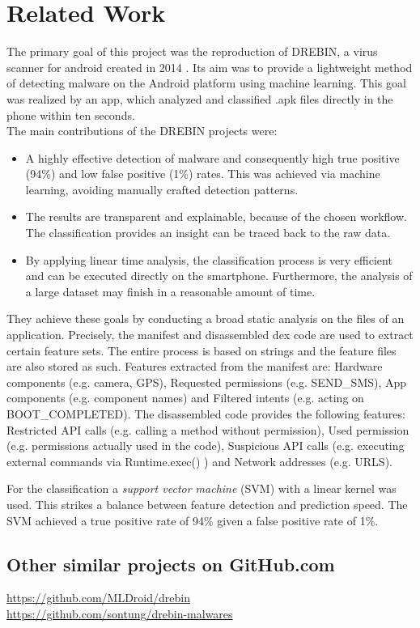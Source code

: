 \section{Related Work}

The primary goal of this project was the reproduction of DREBIN, a
virus scanner for android created in 2014 \cite{drebin}.
Its aim was to provide a lightweight method of detecting malware on
the Android platform using machine learning. This goal was realized
by an app, which analyzed and classified .apk files directly in the
phone within ten seconds. \\
The main contributions of the DREBIN projects were: 
\begin{itemize}
\item A highly effective detection of malware and consequently high true
positive (94\%) and low false positive (1\%) rates. This was achieved
via machine learning, avoiding manually crafted detection patterns. 
\item The results are transparent and explainable, because of the chosen
workflow. The classification provides an insight can be traced back
to the raw data. 
\item By applying linear time analysis, the classification process is very
efficient and can be executed directly on the smartphone. Furthermore,
the analysis of a large dataset may finish in a reasonable amount
of time.
\end{itemize}
They achieve these goals by conducting a broad static analysis on
the files of an application. Precisely, the manifest and disassembled
dex code are used to extract certain feature sets. The entire process
is based on strings and the feature files are also stored as such.
Features extracted from the manifest are: Hardware components (e.g.
camera, GPS), Requested permissions (e.g. SEND\_SMS), App components
(e.g. component names) and Filtered intents (e.g. acting on BOOT\_COMPLETED).
The disassembled code provides the following features: Restricted
API calls (e.g. calling a method without permission), Used permission
(e.g. permissions actually used in the code), Suspicious API calls
(e.g. executing external commands via Runtime.exec() ) and Network
addresses (e.g. URLS). 

For the classification a \emph{support vector machine} (SVM) \cite{cristianini2000introduction} with a linear kernel was used. This strikes a balance between feature detection and prediction speed. The SVM achieved a true positive rate of 94\% given a false positive rate of 1\%.

\subsection{Other similar projects on
	GitHub.com}\label{other-similar-works-on-github.com}

\url{https://github.com/MLDroid/drebin}\\
\url{https://github.com/sontung/drebin-malwares}